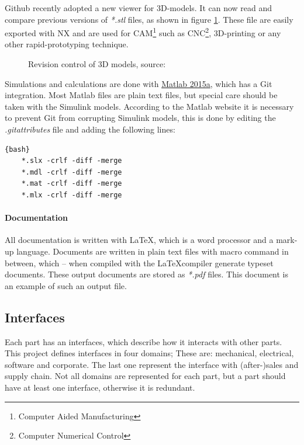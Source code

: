 \documentclass[fleqn,10pt]{SelfArx} %
\begin{document}
Github recently adopted a new viewer for 3D-models. It can now read and compare previous versions of \textit{*.stl} files, as shown in figure \ref{fig:view}. These file are easily exported with NX and are used for CAM\footnote{Computer Aided Manufacturing} such as CNC\footnote{Computer Numerical Control}, 3D-printing or any other rapid-prototyping technique.

\begin{figure}[ht]\centering 
	\caption{Revision control of 3D models, source: \citeauthor{skalnik_3d_2013}\cite{skalnik_3d_2013}}
	\label{fig:view}
\end{figure}

Simulations and calculations are done with \href{http://nl.mathworks.com/products/matlab/}{\color{color1}Matlab 2015a}, which has a Git integration. Most Matlab files are plain text files, but special care should be taken with the Simulink models. According to the Matlab website it is necessary to prevent Git from corrupting Simulink models, this is done by editing the \textit{.gitattributes} file and adding the following lines: 
\begin{lstlisting}{bash}
	*.slx -crlf -diff -merge
	*.mdl -crlf -diff -merge
	*.mat -crlf -diff -merge
	*.mlx -crlf -diff -merge
\end{lstlisting}

\paragraph{Documentation}
All documentation is written with \LaTeX, which is a word processor and a mark-up language. Documents are written in plain text files with macro command in between, which -- when compiled with the \LaTeX compiler generate typeset documents. These output documents are stored as \textit{*.pdf} files. This document is an example of such an output file.

\subsection{Interfaces}\label{sec:Interfaces}
Each part has an interfaces, which describe how it interacts with other parts. This project defines interfaces in four domains; These are: mechanical, electrical, software and corporate. The last one represent the interface with (after-)sales and supply chain.  Not all domains are represented for each part, but a part should have at least one interface, otherwise it is redundant.
\end{document}
